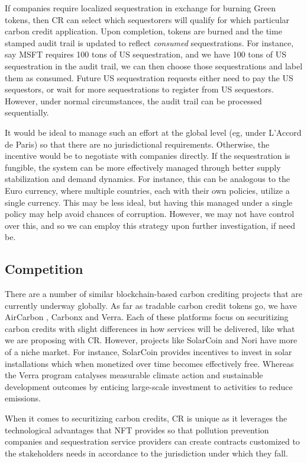 \documentclass{article}
\begin{document}
If companies require localized sequestration in exchange for burning Green tokens, then CR can select which sequestorers will qualify for which particular carbon credit application. Upon completion, tokens are burned and the time stamped audit trail is updated to reflect \emph{consumed} sequestrations. For instance, say MSFT requires 100 tons of US sequestration, and we have 100 tons of US sequestration in the audit trail, we can then choose those sequestrations and label them as consumed. Future US sequestration requests either need to pay the US sequestors, or wait for more sequestrations to register from US sequestors. However, under normal circumstances, the audit trail can be processed sequentially.

It would be ideal to manage such an effort at the global level (eg, under L'Accord de Paris) so that there are no jurisdictional requirements. Otherwise, the incentive would be to negotiate with companies directly. If the sequestration is fungible, the system can be more effectively managed through better supply stabilization and demand dynamics. For instance, this can be analogous to the Euro currency, where multiple countries, each with their own policies, utilize a single currency. This may be less ideal, but having this managed under a single policy may help avoid chances of corruption. However, we may not have control over this, and so we can employ this strategy upon further investigation, if need be.

\subsection{Competition}

There are a number of similar blockchain-based carbon crediting  projects that are currently underway globally. As far as tradable carbon credit tokens go, we have AirCarbon \cite{AirCarbon}, Carbonx \cite{Carbonx} and Verra. Each of these platforms focus on securitizing carbon credits with slight differences in how services will be delivered, like what we are proposing with CR. However, projects like SolarCoin \cite{SolarCoin} and Nori \cite{Nori} have more of a niche market. For instance, SolarCoin provides incentives to invest in solar installations which when monetized over time becomes effectively free.  Whereas the Verra program catalyses measurable climate action and sustainable development outcomes by enticing large-scale investment to activities to reduce emissions.

When it comes to securitizing carbon credits, CR is unique as it leverages the technological advantages that NFT provides so that pollution prevention companies and sequestration service providers can create contracts customized to the  stakeholders needs in accordance to the jurisdiction under which they fall.
\end{document}
